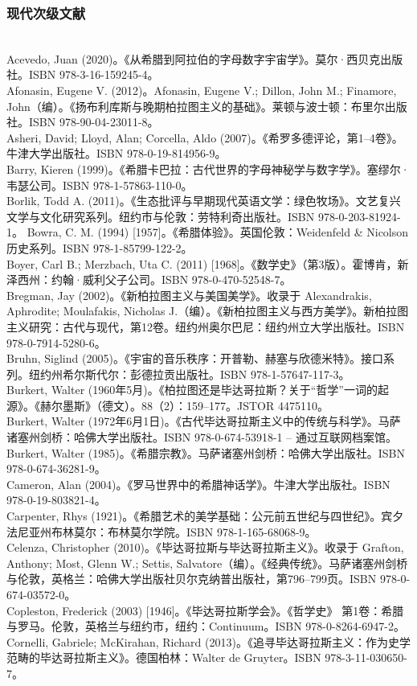 \subsubsection{现代次级文献}\\
Acevedo, Juan (2020)。《从希腊到阿拉伯的字母数字宇宙学》。莫尔·西贝克出版社。ISBN 978-3-16-159245-4。\\  
Afonasin, Eugene V. (2012)。Afonasin, Eugene V.; Dillon, John M.; Finamore, John（编）。《扬布利库斯与晚期柏拉图主义的基础》。莱顿与波士顿：布里尔出版社。ISBN 978-90-04-23011-8。\\  
Asheri, David; Lloyd, Alan; Corcella, Aldo (2007)。《希罗多德评论，第1–4卷》。牛津大学出版社。ISBN 978-0-19-814956-9。\\  
Barry, Kieren (1999)。《希腊卡巴拉：古代世界的字母神秘学与数字学》。塞缪尔·韦瑟公司。ISBN 978-1-57863-110-0。\\ 
Borlik, Todd A. (2011)。《生态批评与早期现代英语文学：绿色牧场》。文艺复兴文学与文化研究系列。纽约市与伦敦：劳特利奇出版社。ISBN 978-0-203-81924-1。  
Bowra, C. M. (1994) [1957]。《希腊体验》。英国伦敦：Weidenfeld & Nicolson 历史系列。ISBN 978-1-85799-122-2。\\  
Boyer, Carl B.; Merzbach, Uta C. (2011) [1968]。《数学史》（第3版）。霍博肯，新泽西州：约翰·威利父子公司。ISBN 978-0-470-52548-7。\\  
Bregman, Jay (2002)。《新柏拉图主义与美国美学》。收录于 Alexandrakis, Aphrodite; Moulafakis, Nicholas J.（编）。《新柏拉图主义与西方美学》。新柏拉图主义研究：古代与现代，第12卷。纽约州奥尔巴尼：纽约州立大学出版社。ISBN 978-0-7914-5280-6。\\  
Bruhn, Siglind (2005)。《宇宙的音乐秩序：开普勒、赫塞与欣德米特》。接口系列。纽约州希尔斯代尔：彭德拉贡出版社。ISBN 978-1-57647-117-3。\\ 
Burkert, Walter (1960年5月)。《柏拉图还是毕达哥拉斯？关于“哲学”一词的起源》。《赫尔墨斯》（德文）。88（2）：159–177。JSTOR 4475110。\\ 
Burkert, Walter (1972年6月1日)。《古代毕达哥拉斯主义中的传统与科学》。马萨诸塞州剑桥：哈佛大学出版社。ISBN 978-0-674-53918-1 – 通过互联网档案馆。  
Burkert, Walter (1985)。《希腊宗教》。马萨诸塞州剑桥：哈佛大学出版社。ISBN 978-0-674-36281-9。\\
Cameron, Alan (2004)。《罗马世界中的希腊神话学》。牛津大学出版社。ISBN 978-0-19-803821-4。\\  
Carpenter, Rhys (1921)。《希腊艺术的美学基础：公元前五世纪与四世纪》。宾夕法尼亚州布林莫尔：布林莫尔学院。ISBN 978-1-165-68068-9。\\  
Celenza, Christopher (2010)。《毕达哥拉斯与毕达哥拉斯主义》。收录于 Grafton, Anthony; Most, Glenn W.; Settis, Salvatore（编）。《经典传统》。马萨诸塞州剑桥与伦敦，英格兰：哈佛大学出版社贝尔克纳普出版社，第796–799页。ISBN 978-0-674-03572-0。\\  
Copleston, Frederick (2003) [1946]。《毕达哥拉斯学会》。《哲学史》 第1卷：希腊与罗马。伦敦，英格兰与纽约市，纽约：Continuum。ISBN 978-0-8264-6947-2。\\  
Cornelli, Gabriele; McKirahan, Richard (2013)。《追寻毕达哥拉斯主义：作为史学范畴的毕达哥拉斯主义》。德国柏林：Walter de Gruyter。ISBN 978-3-11-030650-7。\\  
